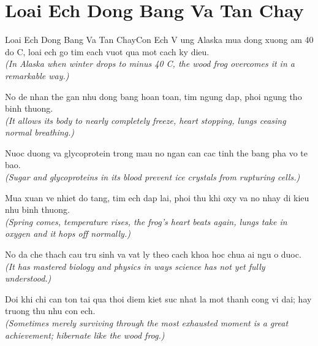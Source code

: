 \section{Loai Ech Dong Bang Va Tan Chay}
\begin{truyen}{Loai Ech Dong Bang Va Tan Chay}{Con Ech}
V ung Alaska mua dong xuong am 40 do C, loai ech go tim each vuot qua mot cach ky dieu.\\
\textit{(In Alaska when winter drops to minus 40 C, the wood frog overcomes it in a remarkable way.)}

No de nhan the gan nhu dong bang hoan toan, tim ngung dap, phoi ngung tho binh thuong.\\
\textit{(It allows its body to nearly completely freeze, heart stopping, lungs ceasing normal breathing.)}

Nuoc duong va glycoprotein trong mau no ngan can cac tinh the bang pha vo te bao.\\
\textit{(Sugar and glycoproteins in its blood prevent ice crystals from rupturing cells.)}

Mua xuan ve nhiet do tang, tim ech dap lai, phoi thu khi oxy va no nhay di kieu nhu binh thuong.\\
\textit{(Spring comes, temperature rises, the frog's heart beats again, lungs take in oxygen and it hops off normally.)}

No da che thach cau tru sinh va vat ly theo cach khoa hoc chua ai ngu o duoc.\\
\textit{(It has mastered biology and physics in ways science has not yet fully understood.)}

\end{truyen}
\begin{baihoc}
  Doi khi chi can ton tai qua thoi diem kiet suc nhat la mot thanh cong vi dai; hay truong thu nhu con ech.\\
  \textit{(Sometimes merely surviving through the most exhausted moment is a great achievement; hibernate like the wood frog.)}
\end{baihoc}


